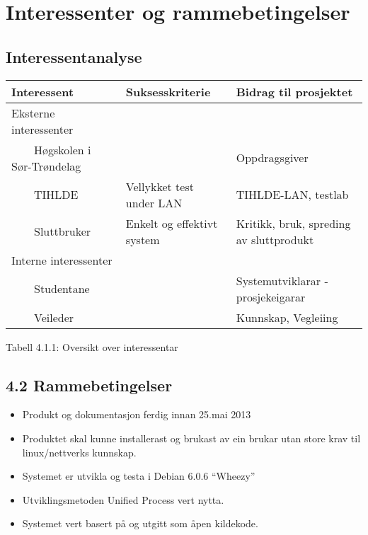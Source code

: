 \documentclass[12pt]{article}
\begin{document}
\section{Interessenter og rammebetingelser}

\subsection{Interessentanalyse}




\begin{flushleft}
\tablefirsthead{}
\tablehead{}
\tabletail{}
\tablelasttail{}
\begin{supertabular}{|m{2.01086in}|m{2.01086in}|m{2.01086in}|}
\hline
Interessent &
Suksesskriterie &
Bidrag til prosjektet\\\hline
Eksterne interessenter &
~
 &
~
\\\hline
\ \ \ \ Høgskolen i Sør{}-Trøndelag &
~
 &
Oppdragsgiver\\\hline
\ \ \ \ TIHLDE &
Vellykket test under LAN &
TIHLDE{}-LAN, testlab\\\hline
\ \ \ \ Sluttbruker  &
Enkelt og effektivt system &
Kritikk, bruk, spreding av sluttprodukt\\\hline
Interne interessenter &
~
 &
~
\\\hline
\ \ \ \ Studentane &
~
 &
Systemutviklarar - prosjekeigarar\\\hline
\ \ \ \ Veileder &
~
 &
Kunnskap, Vegleiing\\\hline
\end{supertabular}
\end{flushleft}
Tabell 4.1.1: Oversikt over interessentar

\subsection{4.2 Rammebetingelser}

\begin{itemize}
\item Produkt og dokumentasjon ferdig innan 25.mai 2013
\item Produktet skal kunne installerast og brukast av ein brukar utan store krav til linux/nettverks kunnskap.
\item Systemet er utvikla og testa i Debian 6.0.6 “Wheezy”
\item Utviklingsmetoden Unified Process vert nytta.
\item Systemet vert basert på og utgitt som åpen kildekode. 
\end{itemize}
\end{document}
